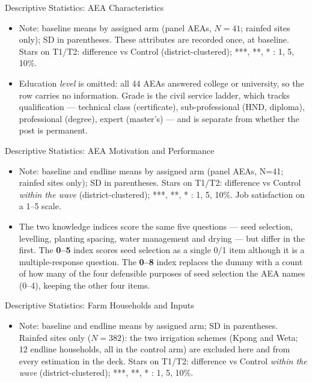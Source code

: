 \documentclass[aspectratio=169]{beamer}
\newcommand{\notefont}{\fontsize{5pt}{6pt}\selectfont}
\begin{document}
\begin{frame}{Descriptive Statistics: AEA Characteristics}
	\centering
	\begin{itemize}\notefont
		\item Note: baseline means by assigned arm (panel AEAs, $N=41$; rainfed sites only);
		SD in parentheses. These attributes are recorded once, at baseline. Stars on T1/T2:
		difference vs Control (district-clustered); ***, **, * : 1, 5, 10\%.
		\item Education \emph{level} is omitted: all 44 AEAs answered college or university,
		so the row carries no information. Grade is the civil service ladder, which tracks
		qualification --- technical class (certificate), sub-professional (HND, diploma),
		professional (degree), expert (master's) --- and is separate from whether the post
		is permanent.
	\end{itemize}
\end{frame}

\begin{frame}{Descriptive Statistics: AEA Motivation and Performance}
	\centering
	\begin{itemize}\notefont
		\item Note: baseline and endline means by assigned arm (panel AEAs, N=41; rainfed sites only); SD in
		parentheses. Stars on T1/T2: difference vs Control \emph{within the wave}
		(district-clustered); ***, **, * : 1, 5, 10\%. Job satisfaction on a 1--5 scale.
		\item The two knowledge indices score the same five questions --- seed selection, levelling, planting spacing, water management and drying --- but differ in the first.
		The \textbf{0--5} index scores seed selection as a single 0/1 item although it is a multiple-response question. The \textbf{0--8} index replaces the dummy with a count of how many of the four defensible purposes of seed selection the AEA names (0--4), keeping the other four items.
	\end{itemize}
\end{frame}

\begin{frame}{Descriptive Statistics: Farm Households and Inputs}
	\centering
	\begin{itemize}\notefont
		\item Note: baseline and endline means by assigned arm; SD in parentheses. Rainfed sites
		only ($N=382$): the two irrigation schemes (Kpong and Weta; 12 endline households, all
		in the control arm) are excluded here and from every estimation in the deck.
		Stars on T1/T2: difference vs Control
		\emph{within the wave} (district-clustered); ***, **, * : 1, 5, 10\%.
	\end{itemize}
\end{frame}
\end{document}
